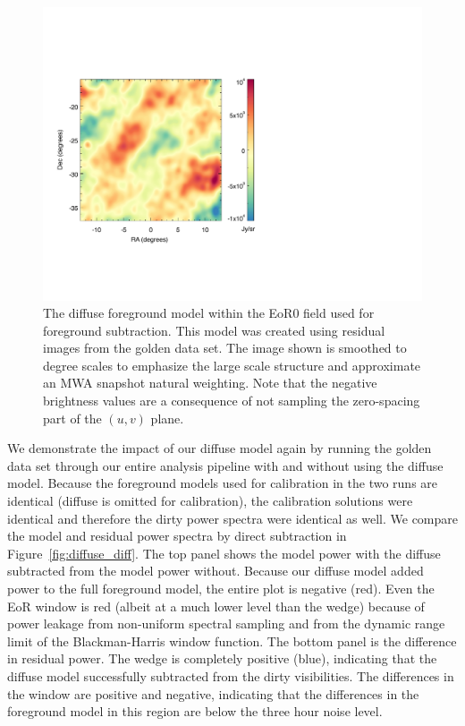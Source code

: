 \documentclass[iop]{emulateapj}
\begin{document}
\begin{figure}
\begin{center}
\includegraphics[width=\columnwidth]{diffuse_sky.pdf}
\caption[Diffuse model used for subtraction]{
The diffuse foreground model within the EoR0 field used for foreground subtraction. This 
model was created using residual images from the golden data set. The image shown is 
smoothed to degree scales to emphasize the large scale structure and approximate an 
MWA snapshot natural weighting. Note that the negative brightness values are a 
consequence of not sampling the zero-spacing part of the $(u,v)$ plane.
\label{fig:diffuse}
}
\end{center}
\end{figure}

We demonstrate the impact of our diffuse model again by running the golden data set 
through our entire analysis pipeline with and without using the diffuse model. Because the 
foreground models used for calibration in the two runs are identical (diffuse is omitted for 
calibration), the calibration solutions were identical and therefore the dirty power spectra 
were identical as well. We compare the model and residual power spectra by direct 
subtraction in Figure~\ref{fig:diffuse_diff}. The top panel shows the model power with the 
diffuse subtracted from the model power without. 
Because our diffuse model added power to the full foreground model, the entire plot is
negative (red).
Even the EoR window is red (albeit at a much lower level than the wedge) because of power
leakage from non-uniform spectral sampling and from the dynamic range limit of the 
Blackman-Harris window function.
The bottom panel is the difference in residual 
power. The wedge is completely positive (blue), indicating that the diffuse model 
successfully subtracted from the dirty visibilities. The differences in the window are positive 
and negative, indicating that 
the differences in the foreground model in this region are below the three hour noise level.
\end{document}
